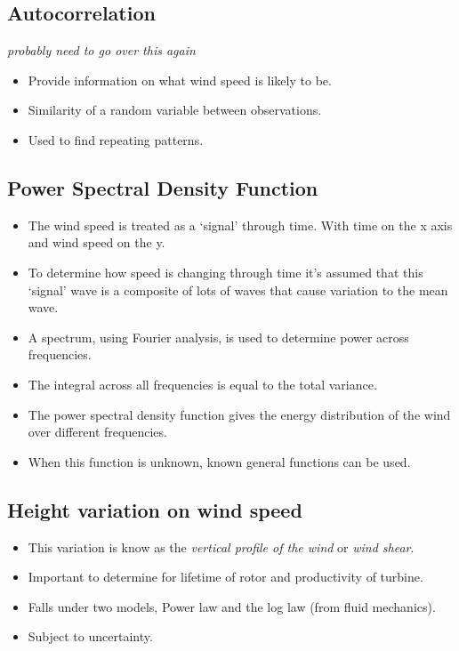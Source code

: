\documentclass[11pt]{article}
\begin{document}
\hypertarget{autocorrelation}{%
\subsection{Autocorrelation}\label{autocorrelation}}

\emph{probably need to go over this again}

\begin{itemize}
\tightlist
\item
  Provide information on what wind speed is likely to be.
\item
  Similarity of a random variable between observations.
\item
  Used to find repeating patterns.
\end{itemize}

\hypertarget{power-spectral-density-function}{%
\subsection{Power Spectral Density
Function}\label{power-spectral-density-function}}

\begin{itemize}
\tightlist
\item
  The wind speed is treated as a `signal' through time. With time on the
  x axis and wind speed on the y.
\item
  To determine how speed is changing through time it's assumed that this
  `signal' wave is a composite of lots of waves that cause variation to
  the mean wave.
\item
  A spectrum, using Fourier analysis, is used to determine power across
  frequencies.
\item
  The integral across all frequencies is equal to the total variance.
\item
  The power spectral density function gives the energy distribution of
  the wind over different frequencies.
\item
  When this function is unknown, known general functions can be used.
\end{itemize}

\hypertarget{height-variation-on-wind-speed}{%
\subsection{Height variation on wind
speed}\label{height-variation-on-wind-speed}}

\begin{itemize}
\tightlist
\item
  This variation is know as the \emph{vertical profile of the wind} or
  \emph{wind shear}.
\item
  Important to determine for lifetime of rotor and productivity of
  turbine.
\item
  Falls under two models, Power law and the log law (from fluid
  mechanics).
\item
  Subject to uncertainty.
\end{itemize}
\end{document}
